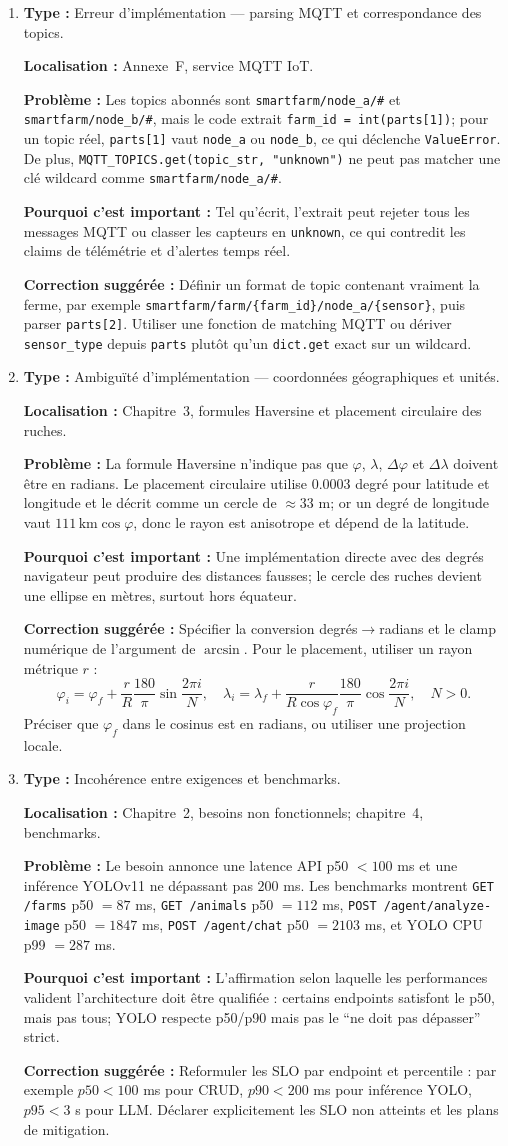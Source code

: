 \documentclass[11pt,a4paper]{article}
\newcommand{\loc}[1]{\textbf{Localisation :} #1\par}
\newcommand{\prob}[1]{\textbf{Problème :} #1\par}
\newcommand{\impact}[1]{\textbf{Pourquoi c'est important :} #1\par}
\newcommand{\fix}[1]{\textbf{Correction suggérée :} #1\par}
\newcommand{\classif}[1]{\textbf{Type :} #1\par}
\begin{document}
\begin{enumerate}
  \item \classif{Erreur d'implémentation --- parsing MQTT et correspondance des topics.}
  \loc{Annexe~F, service MQTT IoT.}
  \prob{Les topics abonnés sont \texttt{smartfarm/node\_a/\#} et \texttt{smartfarm/node\_b/\#}, mais le code extrait \texttt{farm\_id = int(parts[1])}; pour un topic réel, \texttt{parts[1]} vaut \texttt{node\_a} ou \texttt{node\_b}, ce qui déclenche \texttt{ValueError}. De plus, \texttt{MQTT\_TOPICS.get(topic\_str, "unknown")} ne peut pas matcher une clé wildcard comme \texttt{smartfarm/node\_a/\#}.}
  \impact{Tel qu'écrit, l'extrait peut rejeter tous les messages MQTT ou classer les capteurs en \texttt{unknown}, ce qui contredit les claims de télémétrie et d'alertes temps réel.}
  \fix{Définir un format de topic contenant vraiment la ferme, par exemple \texttt{smartfarm/farm/\{farm\_id\}/node\_a/\{sensor\}}, puis parser \texttt{parts[2]}. Utiliser une fonction de matching MQTT ou dériver \texttt{sensor\_type} depuis \texttt{parts} plutôt qu'un \texttt{dict.get} exact sur un wildcard.}

  \item \classif{Ambiguïté d'implémentation --- coordonnées géographiques et unités.}
  \loc{Chapitre~3, formules Haversine et placement circulaire des ruches.}
  \prob{La formule Haversine n'indique pas que \(\varphi\), \(\lambda\), \(\Delta\varphi\) et \(\Delta\lambda\) doivent être en radians. Le placement circulaire utilise \(0.0003\) degré pour latitude et longitude et le décrit comme un cercle de \(\approx 33\) m; or un degré de longitude vaut \(111\,\mathrm{km}\cos\varphi\), donc le rayon est anisotrope et dépend de la latitude.}
  \impact{Une implémentation directe avec des degrés navigateur peut produire des distances fausses; le cercle des ruches devient une ellipse en mètres, surtout hors équateur.}
  \fix{Spécifier la conversion degrés\(\to\)radians et le clamp numérique de l'argument de \(\arcsin\). Pour le placement, utiliser un rayon métrique \(r\) :
  \[
    \varphi_i=\varphi_f+\frac{r}{R}\frac{180}{\pi}\sin\frac{2\pi i}{N},\quad
    \lambda_i=\lambda_f+\frac{r}{R\cos\varphi_f}\frac{180}{\pi}\cos\frac{2\pi i}{N},\quad N>0.
  \]
  Préciser que \(\varphi_f\) dans le cosinus est en radians, ou utiliser une projection locale.}

  \item \classif{Incohérence entre exigences et benchmarks.}
  \loc{Chapitre~2, besoins non fonctionnels; chapitre~4, benchmarks.}
  \prob{Le besoin annonce une latence API p50 \(<100\) ms et une inférence YOLOv11 ne dépassant pas \(200\) ms. Les benchmarks montrent \texttt{GET /farms} p50 \(=87\) ms, \texttt{GET /animals} p50 \(=112\) ms, \texttt{POST /agent/analyze-image} p50 \(=1847\) ms, \texttt{POST /agent/chat} p50 \(=2103\) ms, et YOLO CPU p99 \(=287\) ms.}
  \impact{L'affirmation selon laquelle les performances valident l'architecture doit être qualifiée : certains endpoints satisfont le p50, mais pas tous; YOLO respecte p50/p90 mais pas le \enquote{ne doit pas dépasser} strict.}
  \fix{Reformuler les SLO par endpoint et percentile : par exemple \(p50<100\) ms pour CRUD, \(p90<200\) ms pour inférence YOLO, \(p95<3\) s pour LLM. Déclarer explicitement les SLO non atteints et les plans de mitigation.}


\end{enumerate}
\end{document}
